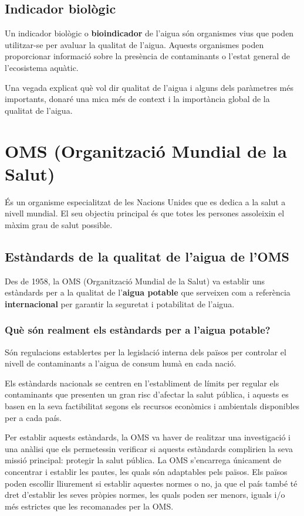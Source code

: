 \subsection{Indicador biològic} \label{subsec:indicadorbiologic}
Un indicador biològic o \textbf{bioindicador} de l’aigua són organismes vius que poden utilitzar-se per avaluar la qualitat de l’aigua. Aquests organismes poden proporcionar informació sobre la presència de contaminants o l’estat general de l’ecosistema aquàtic.

Una vegada explicat què vol dir qualitat de l’aigua i alguns dels paràmetres més importants, donaré una mica més de context i la importància global de la qualitat de l’aigua.

\section{OMS (Organització Mundial de la Salut)}
És un organisme especialitzat de les Nacions Unides que es dedica a la salut a nivell mundial. El seu objectiu principal és que totes les persones assoleixin el màxim grau de salut possible.
\subsection{Estàndards de la qualitat de l’aigua de l’OMS}
Des de 1958, la OMS (Organització Mundial de la Salut) va establir uns estàndards per a la qualitat de l’\textbf{aigua potable} que serveixen com a referència \textbf{internacional} per garantir la seguretat i potabilitat de l’aigua.
\subsubsection{Què són realment els estàndards per a l’aigua potable?}
Són regulacions establertes per la legislació interna dels països per controlar el nivell de contaminants a l’aigua de consum humà en cada nació.

Els estàndards nacionals se centren en l’establiment de límits per regular els contaminants que presenten un gran risc d’afectar la salut pública, i aquests es basen en la seva factibilitat segons els recursos econòmics i ambientals disponibles per a cada país.

Per establir aquests estàndards, la OMS va haver de realitzar una investigació i una anàlisi que els permetessin verificar si aquests estàndards complirien la seva missió principal: protegir la salut pública. La OMS s’encarrega únicament de concentrar i establir les pautes, les quals són adaptables pels països. Els països poden escollir lliurement si establir aquestes normes o no, ja que el país també té dret d’establir les seves pròpies normes, les quals poden ser menors, iguals i/o més estrictes que les recomanades per la OMS.
